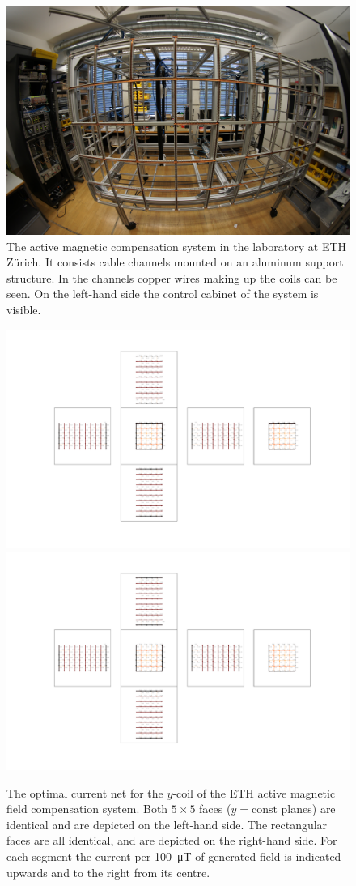 \begin{figure}
  \centering
  \includegraphics[width=0.75\linewidth]{gfx/prototype/DSC03472.JPG}
  \caption{The active magnetic compensation system in the laboratory at ETH Zürich. It consists cable channels mounted on an aluminum support structure. In the channels copper wires making up the coils can be seen. On the left-hand side the control cabinet of the system is visible.}\label{fig:prototype_photo}
\end{figure}

\begin{figure}
  \centering
  \includegraphics[height=0.3\linewidth]{gfx/prototype/coil_design_y_100uT_1.pdf}
  \quad\quad
  \includegraphics[height=0.3\linewidth]{gfx/prototype/coil_design_y_100uT_2.pdf}
  \caption{The optimal current net for the $y$-coil of the ETH active magnetic field compensation system. Both $5 \times 5$ faces ($y = \mathrm{const}$ planes) are identical and are depicted on the left-hand side. The rectangular faces are all identical, and are depicted on the right-hand side. For each segment the current per \SI{100}{\micro\tesla} of generated field is indicated upwards and to the right from its centre.}\label{fig:prototype_coil_y_currents}
\end{figure}

